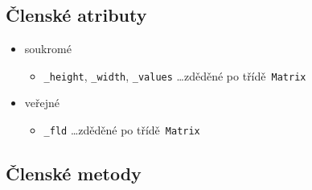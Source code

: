 \documentclass[11pt,a4paper]{article}
\begin{document}
\subsection{Členské atributy}

\begin{itemize}
  \item soukromé
  \begin{itemize}
    \item \verb=_height=, \verb=_width=, \verb=_values= \ldots zděděné po
      třídě~\verb=Matrix=
  \end{itemize}
  \item veřejné
  \begin{itemize}
    \item \verb=_fld= \ldots zděděné po třídě~\verb=Matrix=
  \end{itemize}
\end{itemize}

\subsection{Členské metody}
\end{document}
